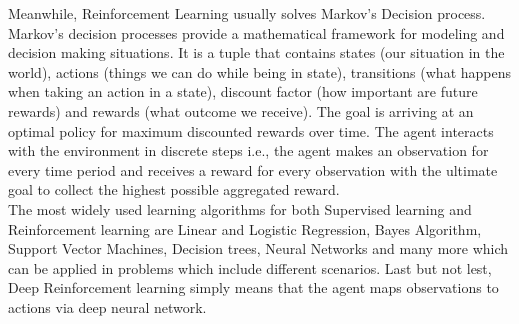 \documentclass{article}
\begin{document}
Meanwhile, Reinforcement Learning usually solves Markov’s Decision process. Markov's decision processes provide a mathematical framework for modeling and decision making situations. It is a tuple that contains states (our situation in the world), actions (things we can do while being in state), transitions (what happens when taking an action in a state), discount factor (how important are future rewards) and rewards (what outcome we receive). The goal is arriving at an optimal policy for maximum discounted rewards over time. The agent interacts with the environment in discrete steps i.e., the agent makes an observation for every time period and receives a reward for every observation with the ultimate goal to collect the highest possible aggregated reward. \\

The most widely used learning algorithms for both Supervised learning and Reinforcement learning are Linear and Logistic Regression, Bayes Algorithm, Support Vector Machines, Decision trees, Neural Networks and many more which can be applied in problems which include different scenarios. Last but not lest, Deep Reinforcement learning simply means that the agent maps observations to actions via deep neural network.

\printbibliography
\end{document}
